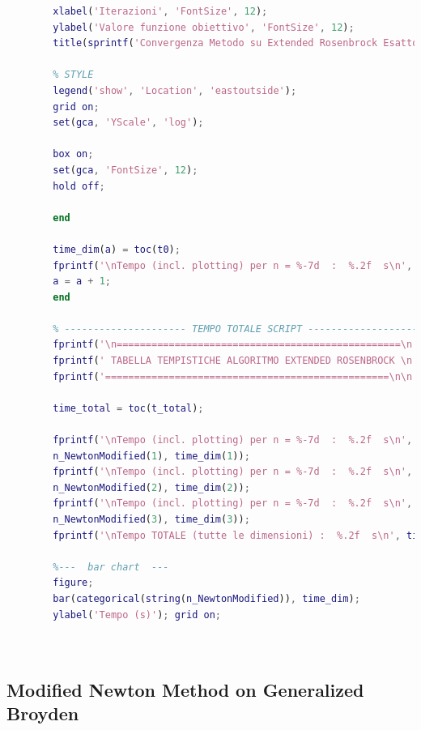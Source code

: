 \documentclass[a4paper,12pt]{article}
\begin{document}
\begin{lstlisting}[language=Matlab,caption={Full script: Modified Newton method on Extended Rosenbrock},label={lst:rosenbrock-extended}]
		% Titoli e assi
		xlabel('Iterazioni', 'FontSize', 12);
		ylabel('Valore funzione obiettivo', 'FontSize', 12);
		title(sprintf('Convergenza Metodo su Extended Rosenbrock Esatto (n = %d)', j), 'FontSize', 14);
		
		% STYLE
		legend('show', 'Location', 'eastoutside');
		grid on;
		set(gca, 'YScale', 'log');
		
		box on;
		set(gca, 'FontSize', 12);
		hold off;
		
		end
		
		time_dim(a) = toc(t0);
		fprintf('\nTempo (incl. plotting) per n = %-7d  :  %.2f  s\n', j, time_dim(a));
		a = a + 1;
		end
		
		% --------------------- TEMPO TOTALE SCRIPT ----------------------
		fprintf('\n=================================================\n');
		fprintf(' TABELLA TEMPISTICHE ALGORITMO EXTENDED ROSENBROCK \n');
		fprintf('=================================================\n\n');
		
		time_total = toc(t_total);
		
		fprintf('\nTempo (incl. plotting) per n = %-7d  :  %.2f  s\n', ...
		n_NewtonModified(1), time_dim(1));
		fprintf('\nTempo (incl. plotting) per n = %-7d  :  %.2f  s\n', ...
		n_NewtonModified(2), time_dim(2));
		fprintf('\nTempo (incl. plotting) per n = %-7d  :  %.2f  s\n', ...
		n_NewtonModified(3), time_dim(3));
		fprintf('\nTempo TOTALE (tutte le dimensioni) :  %.2f  s\n', time_total);
		
		%---  bar chart  ---
		figure;
		bar(categorical(string(n_NewtonModified)), time_dim);
		ylabel('Tempo (s)'); grid on;
		
		
	\end{lstlisting}
	\newpage
	\subsection*{Modified Newton Method on Generalized Broyden}
\end{document}
